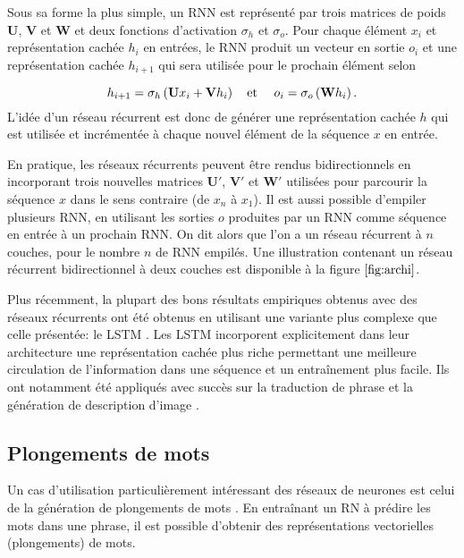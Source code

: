 Sous sa forme la plus simple, un RNN est représenté par trois matrices
de poids $\mathbf{U}$, $\mathbf{V}$ et $\mathbf{W}$ et deux fonctions 
d'activation $\sigma_h$ et $\sigma_o$.
Pour chaque élément $x_i$ et représentation cachée $h_i$ en entrées, le RNN produit un vecteur 
en sortie $o_i$ et une représentation cachée $h_{i+1}$ qui sera utilisée pour 
le prochain élément selon 

\begin{equation*}
    h_{i+1} = \sigma_h\left(\mathbf{U}x_i + \mathbf{V}h_i\right) \text{\quad et \quad}
    o_i = \sigma_o\left(\mathbf{W}h_i\right).
\end{equation*}
L'idée d'un réseau récurrent est donc de générer une représentation cachée $h$
qui est utilisée et incrémentée à chaque nouvel élément de la séquence $x$ en entrée.

En pratique, les réseaux récurrents peuvent être rendus bidirectionnels en incorporant 
trois nouvelles matrices $\mathbf{U}'$, $\mathbf{V}'$ et $\mathbf{W}'$ utilisées 
pour parcourir la séquence $x$ dans le sens contraire (de $x_n$ à $x_1$).
Il est aussi possible d'empiler plusieurs RNN, en utilisant les sorties $o$
produites par un RNN comme séquence en entrée à un prochain RNN.
On dit alors que l'on a un réseau récurrent à $n$ couches, pour le nombre 
$n$ de RNN empilés.
Une illustration contenant un réseau récurrent bidirectionnel à deux couches est disponible
à la figure $\ref{fig:archi}$.

Plus récemment, la plupart des bons résultats empiriques obtenus avec 
des réseaux récurrents ont été obtenus en utilisant une variante plus 
complexe que celle présentée: le LSTM \citep{iet:/content/conferences/10.1049/cp_19991218}.
Les LSTM incorporent explicitement dans leur architecture 
une représentation cachée plus riche 
permettant une meilleure circulation de l'information 
dans une séquence et un entraînement plus facile.
Ils ont notamment été appliqués avec succès sur la traduction 
de phrase \citep{wu2016googles} et la génération de description
d'image \citep{xu2016show}.

\subsection{Plongements de mots}

Un cas d'utilisation particulièrement intéressant 
des réseaux de neurones est celui de la génération de plongements 
de mots \citep{NIPS2013_9aa42b31,pennington2014glove,joulin2016bag}.
En entraînant un RN à prédire les mots dans une phrase,
il est possible d'obtenir des représentations vectorielles (plongements)
de mots.

